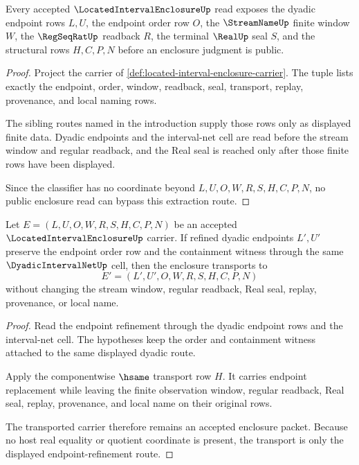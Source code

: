 \begin{theorem}
\label{thm:located-interval-enclosure-carrier-extraction}
Every accepted $\LocatedIntervalEnclosureUp$ read exposes the dyadic endpoint rows $L,U$, the endpoint order row $O$, the $\StreamNameUp$ finite window $W$, the $\RegSeqRatUp$ readback $R$, the terminal $\RealUp$ seal $S$, and the structural rows $H,C,P,N$ before an enclosure judgment is public.
\end{theorem}
\begin{proof}
Project the carrier of \autoref{def:located-interval-enclosure-carrier}. The tuple lists exactly the endpoint, order, window, readback, seal, transport, replay, provenance, and local naming rows.

The sibling routes named in the introduction supply those rows only as displayed finite data. Dyadic endpoints and the interval-net cell are read before the stream window and regular readback, and the Real seal is reached only after those finite rows have been displayed.

Since the classifier has no coordinate beyond $L,U,O,W,R,S,H,C,P,N$, no public enclosure read can bypass this extraction route.
\end{proof}

\begin{theorem}
\label{thm:located-interval-enclosure-endpoint-refinement-transport}
Let $E=(L,U,O,W,R,S,H,C,P,N)$ be an accepted $\LocatedIntervalEnclosureUp$ carrier. If refined dyadic endpoints $L',U'$ preserve the endpoint order row and the containment witness through the same $\DyadicIntervalNetUp$ cell, then the enclosure transports to
$$
E'=(L',U',O,W,R,S,H,C,P,N)
$$
without changing the stream window, regular readback, Real seal, replay, provenance, or local name.
\end{theorem}
\begin{proof}
Read the endpoint refinement through the dyadic endpoint rows and the interval-net cell. The hypotheses keep the order and containment witness attached to the same displayed dyadic route.

Apply the componentwise $\hsame$ transport row $H$. It carries endpoint replacement while leaving the finite observation window, regular readback, Real seal, replay, provenance, and local name on their original rows.

The transported carrier therefore remains an accepted enclosure packet. Because no host real equality or quotient coordinate is present, the transport is only the displayed endpoint-refinement route.
\end{proof}

